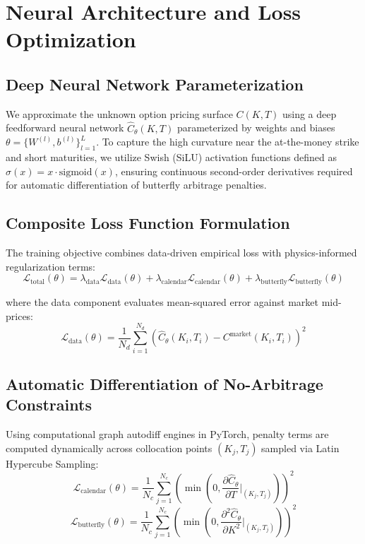 \chapter{Neural Architecture and Loss Optimization}
\section{Deep Neural Network Parameterization}
We approximate the unknown option pricing surface $C(K, T)$ using a deep feedforward neural network $\hat{C}_\theta(K, T)$ parameterized by weights and biases $\theta = \{W^{(l)}, b^{(l)}\}_{l=1}^{L}$. To capture the high curvature near the at-the-money strike and short maturities, we utilize Swish (SiLU) activation functions defined as $\sigma(x) = x \cdot \text{sigmoid}(x)$, ensuring continuous second-order derivatives required for automatic differentiation of butterfly arbitrage penalties.

\section{Composite Loss Function Formulation}
The training objective combines data-driven empirical loss with physics-informed regularization terms:
$$\mathcal{L}_{\text{total}}(\theta) = \lambda_{\text{data}} \mathcal{L}_{\text{data}}(\theta) + \lambda_{\text{calendar}} \mathcal{L}_{\text{calendar}}(\theta) + \lambda_{\text{butterfly}} \mathcal{L}_{\text{butterfly}}(\theta)$$

where the data component evaluates mean-squared error against market mid-prices:
$$\mathcal{L}_{\text{data}}(\theta) = \frac{1}{N_d} \sum_{i=1}^{N_d} \left( \hat{C}_\theta(K_i, T_i) - C^{\text{market}}(K_i, T_i) \right)^2$$

\section{Automatic Differentiation of No-Arbitrage Constraints}
Using computational graph autodiff engines in PyTorch, penalty terms are computed dynamically across collocation points $(K_j, T_j)$ sampled via Latin Hypercube Sampling:
$$\mathcal{L}_{\text{calendar}}(\theta) = \frac{1}{N_c} \sum_{j=1}^{N_c} \left( \min\left(0, \frac{\partial \hat{C}_\theta}{\partial T}\Big|_{(K_j, T_j)}\right) \right)^2$$
$$\mathcal{L}_{\text{butterfly}}(\theta) = \frac{1}{N_c} \sum_{j=1}^{N_c} \left( \min\left(0, \frac{\partial^2 \hat{C}_\theta}{\partial K^2}\Big|_{(K_j, T_j)}\right) \right)^2$$

